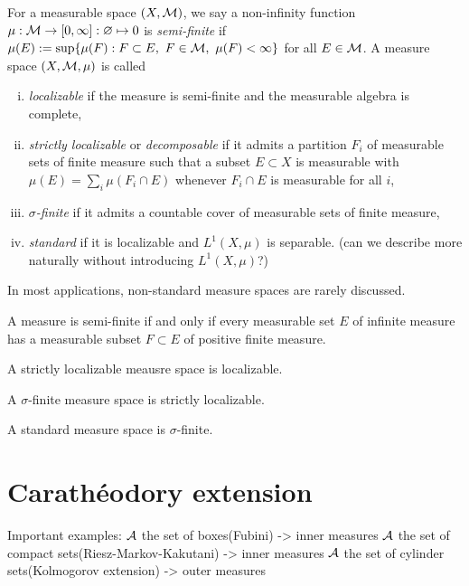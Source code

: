 \documentclass{../../large}
\begin{document}
\begin{prb}
For a measurable space $(X,\mathcal{M})$, we say a non-infinity function $\mu:\mathcal{M}\to[0,\infty]:\varnothing\mapsto0$ is \emph{semi-finite} if $\mu(E):=\sup\{\mu(F):F\subset E,\ F\in\cM,\ \mu(F)<\infty\}$ for all $E\in\mathcal{M}$.
A measure space $(X,\mathcal{M},\mu)$ is called
\begin{enumerate}[(i)]
\item \emph{localizable} if the measure is semi-finite and the measurable algebra is complete,
\item \emph{strictly localizable} or \emph{decomposable} if it admits a partition $F_i$ of measurable sets of finite measure such that a subset $E\subset X$ is measurable with $\mu(E)=\sum_i\mu(F_i\cap E)$ whenever $F_i\cap E$ is measurable for all $i$,
\item \emph{$\sigma$-finite} if it admits a countable cover of measurable sets of finite measure,
\item \emph{standard} if it is localizable and $L^1(X,\mu)$ is separable. (can we describe more naturally without introducing $L^1(X,\mu)$?)
\end{enumerate}
In most applications, non-standard measure spaces are rarely discussed.
\begin{parts}
\item A measure is semi-finite if and only if every measurable set $E$ of infinite measure has a measurable subset $F\subset E$ of positive finite measure.
\item A strictly localizable meausre space is localizable.
\item A $\sigma$-finite measure space is strictly localizable.
\item A standard measure space is $\sigma$-finite.
\end{parts}
\end{prb}


\begin{prb}
\end{prb}


\section{Carath\'eodory extension}

Important examples:
$\mathcal{A}$ the set of boxes(Fubini) -> inner measures
$\mathcal{A}$ the set of compact sets(Riesz-Markov-Kakutani) -> inner measures
$\mathcal{A}$ the set of cylinder sets(Kolmogorov extension) -> outer measures
\end{document}
